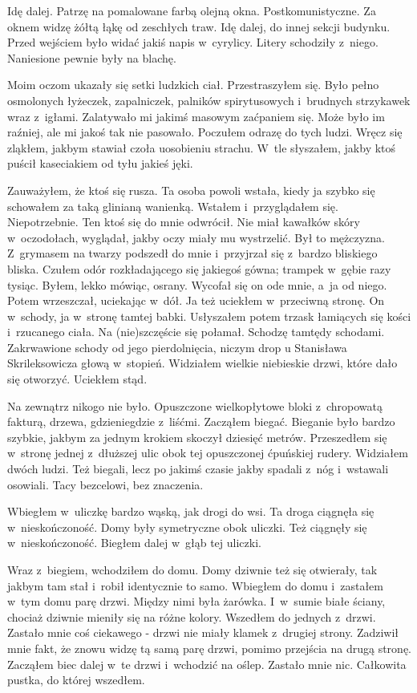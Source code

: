 Idę dalej. Patrzę na pomalowane farbą olejną okna. Postkomunistyczne. Za oknem widzę żółtą łąkę od zeschłych traw. Idę dalej, do innej sekcji budynku. Przed wejściem było widać jakiś napis w~cyrylicy. Litery schodziły z~niego. Naniesione pewnie były na blachę.

Moim oczom ukazały się setki ludzkich ciał. Przestraszyłem się. Było pełno osmolonych łyżeczek, zapalniczek, palników spirytusowych i~brudnych strzykawek wraz z~igłami. Zalatywało mi jakimś masowym zaćpaniem się. Może było im raźniej, ale mi jakoś tak nie pasowało. Poczułem odrazę do tych ludzi. Wręcz się zląkłem, jakbym stawiał czoła uosobieniu strachu. W~tle słyszałem, jakby ktoś puścił kaseciakiem od tyłu jakieś jęki.

Zauważyłem, że ktoś się rusza. Ta osoba powoli wstała, kiedy ja szybko się schowałem za taką glinianą wanienką. Wstałem i~przyglądałem się. Niepotrzebnie. Ten ktoś się do mnie odwrócił. Nie miał kawałków skóry w~oczodołach, wyglądał, jakby oczy miały mu wystrzelić. Był to mężczyzna. Z~grymasem na twarzy podszedł do mnie i~przyjrzał się z~bardzo bliskiego bliska. Czułem odór rozkładającego się jakiegoś gówna; trampek w~gębie razy tysiąc. Byłem, lekko mówiąc, osrany. Wycofał się on ode mnie, a~ja od niego. Potem wrzeszczał, uciekając w~dół. Ja też uciekłem w~przeciwną stronę. On w~schody, ja w~stronę tamtej babki. Usłyszałem potem trzask łamiących się kości i~rzucanego ciała. Na (nie)szczęście się połamał. Schodzę tamtędy schodami. Zakrwawione schody od jego pierdolnięcia, niczym drop u Stanisława Skrileksowicza głową w~stopień. Widziałem wielkie niebieskie drzwi, które dało się otworzyć. Uciekłem stąd.

\paraSep

Na zewnątrz nikogo nie było. Opuszczone wielkopłytowe bloki z~chropowatą fakturą, drzewa, gdzieniegdzie z~liśćmi. Zacząłem biegać. Bieganie było bardzo szybkie, jakbym za jednym krokiem skoczył dziesięć metrów. Przeszedłem się w~stronę jednej z~dłuższej ulic obok tej opuszczonej ćpuńskiej rudery. Widziałem dwóch ludzi. Też biegali, lecz po jakimś czasie jakby spadali z~nóg i~wstawali osowiali. Tacy bezcelowi, bez znaczenia.

Wbiegłem w~uliczkę bardzo wąską, jak drogi do wsi. Ta droga ciągnęła się w~nieskończoność. Domy były symetryczne obok uliczki. Też ciągnęły się w~nieskończoność. Biegłem dalej w~głąb tej uliczki.

\paraSep

Wraz z~biegiem, wchodziłem do domu. Domy dziwnie też się otwierały, tak jakbym tam stał i~robił identycznie to samo. Wbiegłem do domu i~zastałem w~tym domu parę drzwi. Między nimi była żarówka. I~w~sumie białe ściany, chociaż dziwnie mieniły się na różne kolory. Wszedłem do jednych z~drzwi. Zastało mnie coś ciekawego - drzwi nie miały klamek z~drugiej strony. Zadziwił mnie fakt, że znowu widzę tą samą parę drzwi, pomimo przejścia na drugą stronę. Zacząłem biec dalej w~te drzwi i~wchodzić na oślep. Zastało mnie nic. Całkowita pustka, do której wszedłem.

